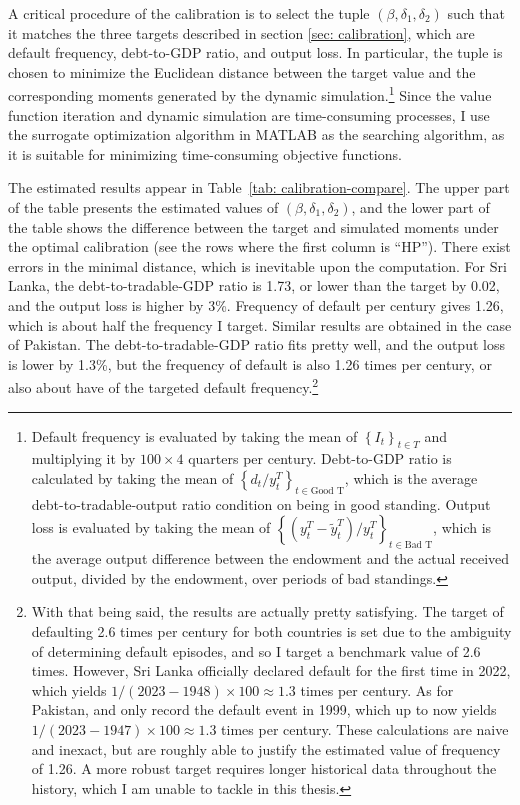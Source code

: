 A critical procedure of the calibration is to select the tuple $(\beta, \delta_1, \delta_2)$ such that it matches the three targets described in section \ref{sec: calibration}, which are default frequency, debt-to-GDP ratio, and output loss.
In particular, the tuple is chosen to minimize the Euclidean distance between the target value and the corresponding moments generated by the dynamic simulation.\footnote{
    Default frequency is evaluated by taking the mean of $\left\{ I_{t} \right\}_{t \in T}$ and multiplying it by $100\times 4$ quarters per century. Debt-to-GDP ratio is calculated by taking the mean of $\left\{ d_t / y^T_t \right\}_{t \in \text{Good T}}$, which is the average debt-to-tradable-output ratio condition on being in good standing. Output loss is evaluated by taking the mean of $\left\{ (y^T_t - \tilde{y}^T_t)/y^T_t \right\}_{t \in \text{Bad T}}$, which is the average output difference between the endowment and the actual received output, divided by the endowment, over periods of bad standings.
}
Since the value function iteration and dynamic simulation are time-consuming processes, I use the surrogate optimization algorithm in MATLAB as the searching algorithm, as it is suitable for minimizing time-consuming objective functions.

The estimated results appear in Table~\ref{tab: calibration-compare}.
The upper part of the table presents the estimated values of $(\beta, \delta_1, \delta_2)$, and the lower part of the table shows the difference between the target and simulated moments under the optimal calibration (see the rows where the first column is ``HP'').
There exist errors in the minimal distance, which is inevitable upon the computation. For Sri Lanka, the debt-to-tradable-GDP ratio is 1.73, or lower than the target by 0.02, and the output loss is higher by 3\%. Frequency of default per century gives 1.26, which is about half the frequency I target. Similar results are obtained in the case of Pakistan. The debt-to-tradable-GDP ratio fits pretty well, and the output loss is lower by 1.3\%, but the frequency of default is also 1.26 times per century, or also about have of the targeted default frequency.\footnote{
    With that being said, the results are actually pretty satisfying. The target of defaulting 2.6 times per century for both countries is set due to the ambiguity of determining default episodes, and so I target a benchmark value of 2.6 times. However, Sri Lanka officially declared default for the first time in 2022, which yields $1/(2023-1948) \times 100 \approx 1.3$ times per century. As for Pakistan, \citet{Uribe-Schmitt-Grohe-textbook} and \citet{SPGlobal-default-report} only record the default event in 1999, which up to now yields $1/(2023-1947) \times 100 \approx 1.3$ times per century. These calculations are naive and inexact, but are roughly able to justify the estimated value of frequency of 1.26. A more robust target requires longer historical data throughout the history, which I am unable to tackle in this thesis.
}